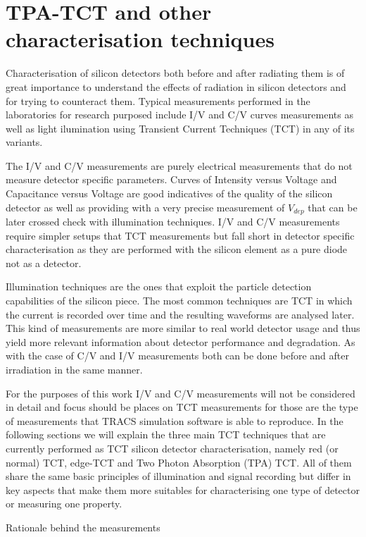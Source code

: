 \chapter{TPA-TCT and other characterisation techniques}

Characterisation of silicon detectors both before and after radiating them is of great importance to understand the effects of radiation in silicon detectors and for trying to counteract them. Typical measurements performed in the laboratories for research purposed include I/V and C/V curves measurements as well as light ilumination using Transient Current Techniques (TCT) in any of its variants. 

The I/V and C/V measurements are purely electrical measurements that do not measure detector specific parameters. Curves of Intensity versus Voltage and Capacitance versus Voltage are good indicatives of the quality of the silicon detector as well as providing with a very precise measurement of $V_{dep}$ that can be later crossed check with illumination techniques. I/V and C/V measurements require simpler setups that TCT measurements but fall short in detector specific characterisation as they are performed with the silicon element as a pure diode not as a detector.

Illumination techniques are the ones that exploit the particle detection capabilities of the silicon piece. The most common techniques are TCT in which the current is recorded over time and the resulting waveforms are analysed later. This kind of measurements are more similar to real world detector usage and thus yield more relevant information about detector performance and degradation. As with the case of C/V and I/V measurements both can be done before and after irradiation in the same manner.

For the purposes of this work I/V and C/V measurements will not be considered in detail and focus should be places on TCT measurements for those are the type of measurements that TRACS simulation software is able to reproduce. In the following sections we will explain the three main TCT techniques that are currently performed as TCT silicon detector characterisation, namely red (or normal) TCT, edge-TCT and Two Photon Absorption (TPA) TCT. All of them share the same basic principles of illumination and signal recording but differ in key aspects that make them more suitables for characterising one type of detector or measuring one property. 

Rationale behind the measurements

